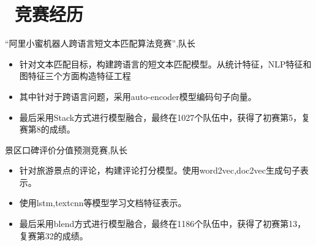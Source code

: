 \documentclass{resume}
\begin{document}

\vspace{-1ex}
\section{\faSitemap\ 竞赛经历}
{“阿里小蜜机器人跨语言短文本匹配算法竞赛”,队长}
\begin{onehalfspacing}
\begin{itemize}
	\item 针对文本匹配目标，构建跨语言的短文本匹配模型。从统计特征，NLP特征和图特征三个方面构造特征工程 \item 其中针对于跨语言问题，采用auto-encoder模型编码句子向量。
	\item 最后采用Stack方式进行模型融合，最终在1027个队伍中，获得了初赛第5，复赛第8的成绩。

\end{itemize}
\end{onehalfspacing}
\begin{onehalfspacing}
{景区口碑评价分值预测竞赛,队长}
\begin{itemize}
	\item 针对旅游景点的评论，构建评论打分模型。使用word2vec,doc2vec生成句子表示。
	\item 使用lstm,textcnn等模型学习文档特征表示。
	\item 最后采用blend方式进行模型融合，最终在1186个队伍中，获得了初赛第13，复赛第32的成绩。
\end{itemize}
\end{onehalfspacing}
\vspace{-1ex}
\end{document}
